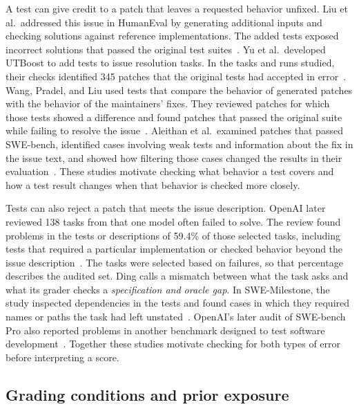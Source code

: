 A test can give credit to a patch that leaves a requested behavior unfixed. Liu et al.\ addressed this issue in HumanEval by generating additional inputs and checking solutions against reference implementations. The added tests exposed incorrect solutions that passed the original test suites~\cite{liu_evalplus_2023}. Yu et al.\ developed UTBoost to add tests to issue resolution tasks. In the tasks and runs studied, their checks identified 345 patches that the original tests had accepted in error~\cite{yu_utboost_2025}. Wang, Pradel, and Liu used tests that compare the behavior of generated patches with the behavior of the maintainers' fixes. They reviewed patches for which those tests showed a difference and found patches that passed the original suite while failing to resolve the issue~\cite{wang_solved_issues_2026}. Aleithan et al.\ examined patches that passed SWE-bench, identified cases involving weak tests and information about the fix in the issue text, and showed how filtering those cases changed the results in their evaluation~\cite{aleithan_swebench_plus_2024}. These studies motivate checking what behavior a test covers and how a test result changes when that behavior is checked more closely.

Tests can also reject a patch that meets the issue description. OpenAI later reviewed 138 tasks from \swebench{} that one model often failed to solve. The review found problems in the tests or descriptions of 59.4\% of those selected tasks, including tests that required a particular implementation or checked behavior beyond the issue description~\cite{openai_swebench_verified_contamination_2025}. The tasks were selected based on failures, so that percentage describes the audited set. Ding calls a mismatch between what the task asks and what its grader checks a \emph{specification and oracle gap}. In SWE-Milestone, the study inspected dependencies in the tests and found cases in which they required names or paths the task had left unstated~\cite{ding_spec_oracle_gaps_2026}. OpenAI's later audit of SWE-bench Pro also reported problems in another benchmark designed to test software development~\cite{openai_swebench_audit_2026}. Together these studies motivate checking for both types of error before interpreting a score.

\subsection{Grading conditions and prior exposure}

